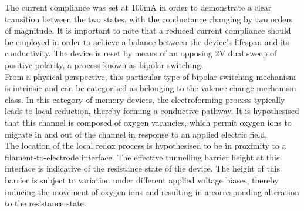 \noindent The current compliance was set at 100mA in order to demonstrate a clear transition between the two states, with the conductance changing by two orders of magnitude. It is important to note that a reduced current compliance should be employed in order to achieve a balance between the device's lifespan and its conductivity. The device is reset by means of an opposing 2V dual sweep of positive polarity, a process known as bipolar switching.\\


\noindent From a physical perspective, this particular type of bipolar switching mechanism is intrinsic and can be categorised as belonging to the valence change mechanism class. In this category of memory devices, the electroforming process typically leads to local reduction, thereby forming a conductive pathway. It is hypothesised that this channel is composed of oxygen vacancies, which permit oxygen ions to migrate in and out of the channel in response to an applied electric field. \\


\noindent The location of the local redox process is hypothesised to be in proximity to a filament-to-electrode interface. The effective tunnelling barrier height at this interface is indicative of the resistance state of the device. The height of this barrier is subject to variation under different applied voltage biases, thereby inducing the movement of oxygen ions and resulting in a corresponding alteration to the resistance state. \\

